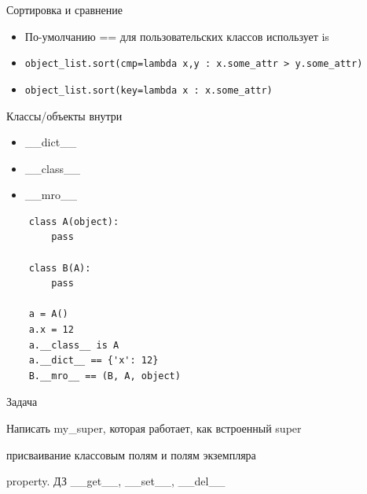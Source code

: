 \documentclass{article}
\begin{document}
\begin{center} Сортировка и сравнение \end{center}
\begin{itemize}
    \item По-умолчанию == для пользовательских классов использует is
    \item \lstinline!object_list.sort(cmp=lambda x,y : x.some_attr > y.some_attr)!
    \item \lstinline!object_list.sort(key=lambda x : x.some_attr)!
\end{itemize}
\newpage

\begin{center}Классы/объекты внутри\end{center}
\begin{itemize}
    \item \_\_dict\_\_
    \item \_\_class\_\_
    \item \_\_mro\_\_
\end{itemize}
\begin{lstlisting}
    class A(object):
        pass

    class B(A):
        pass

    a = A()
    a.x = 12
    a.__class__ is A
    a.__dict__ == {'x': 12}
    B.__mro__ == (B, A, object)
\end{lstlisting}
\newpage


\begin{center}Задача\end{center}
Написать my\_super, которая работает, как встроенный super 
\newpage

\begin{center}присваивание классовым полям и полям экземпляра\end{center}
\newpage

property. ДЗ \_\_get\_\_, \_\_set\_\_, \_\_del\_\_
\newpage
\end{document}
